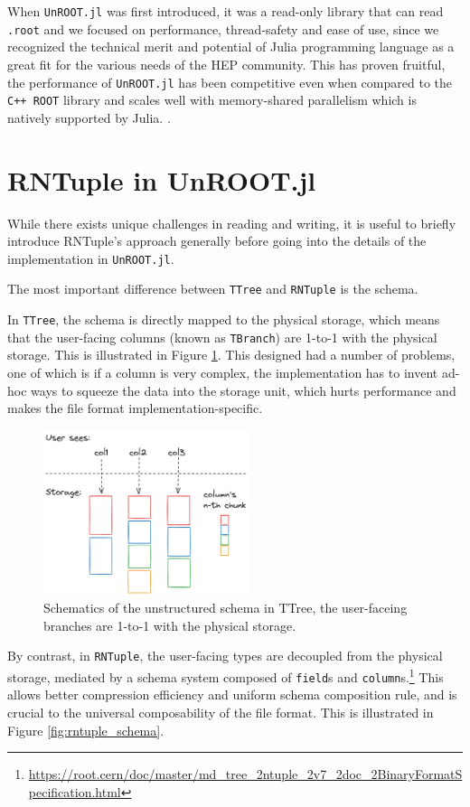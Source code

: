 \documentclass{juliacon}
\begin{document}
When \verb|UnROOT.jl| was first introduced, it was a read-only library that can read \verb|.root|
and we focused on performance, thread-safety and ease of use, since we recognized the technical
merit and potential of Julia programming language as a great fit for the various needs of the HEP
community. This has proven fruitful, the performance of \verb|UnROOT.jl| has been competitive even
when compared to the \verb|C++ ROOT| library and scales well with memory-shared parallelism which is
natively supported by Julia.
\cite{chep_2023}.

\section{RNTuple in UnROOT.jl}
While there exists unique challenges in reading and writing, it is useful to briefly introduce
RNTuple's approach generally before going into the details of the implementation in
\verb|UnROOT.jl|. 

The most important difference between \verb|TTree| and \verb|RNTuple| is the schema.

In
\verb|TTree|, the schema is directly mapped to the physical storage, which means that the
user-facing columns (known as \verb|TBranch|) are 1-to-1 with the physical storage. This is
illustrated in Figure \ref{fig:ttree_schema}. This designed had a number of problems, one of which
is if a column is very complex, the implementation has to invent ad-hoc ways to squeeze the data
into the storage unit, which hurts performance and makes the file format 
implementation-specific.


\begin{figure}[h]
\centerline{\includegraphics[width=6cm]{ttree_schema.png}}
\caption{Schematics of the unstructured schema in TTree, the user-faceing branches are 1-to-1
with the physical storage.}
	\label{fig:ttree_schema}
\end{figure}

By contrast, in \verb|RNTuple|, the user-facing types are decoupled from the physical storage,
mediated by a schema system composed of \verb|field|s and
\verb|column|s.\footnote{\url{https://root.cern/doc/master/md_tree_2ntuple_2v7_2doc_2BinaryFormatSpecification.html}}
This allows better compression efficiency and uniform schema composition rule, and is crucial to the
universal composability of the file format. This is illustrated in Figure \ref{fig:rntuple_schema}.
\end{document}
